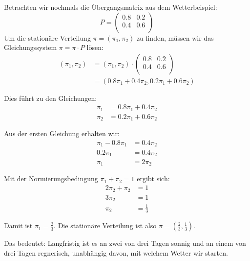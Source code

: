\begin{myexample}
    Betrachten wir nochmals die Übergangsmatrix aus dem Wetterbeispiel:
    \[
        P =
        \begin{pmatrix}
            0.8 & 0.2 \\
            0.4 & 0.6 \\
        \end{pmatrix}
    \]
    Um die stationäre Verteilung $\pi = (\pi_1, \pi_2)$ zu finden, müssen wir das Gleichungssystem $\pi = \pi \cdot P$ lösen:
    \[
        \begin{aligned}
            (\pi_1, \pi_2) & = (\pi_1, \pi_2) \cdot
            \begin{pmatrix}
                0.8 & 0.2 \\
                0.4 & 0.6 \\
            \end{pmatrix}                                            \\
                           & = (0.8\pi_1 + 0.4\pi_2, 0.2\pi_1 + 0.6\pi_2)
        \end{aligned}
    \]

    Dies führt zu den Gleichungen:
    \begin{align}
        \pi_1 & = 0.8\pi_1 + 0.4\pi_2 \\
        \pi_2 & = 0.2\pi_1 + 0.6\pi_2
    \end{align}

    Aus der ersten Gleichung erhalten wir:
    \begin{align}
        \pi_1 - 0.8\pi_1 & = 0.4\pi_2 \\
        0.2\pi_1         & = 0.4\pi_2 \\
        \pi_1            & = 2\pi_2
    \end{align}

    Mit der Normierungsbedingung $\pi_1 + \pi_2 = 1$ ergibt sich:
    \begin{align}
        2\pi_2 + \pi_2 & = 1           \\
        3\pi_2         & = 1           \\
        \pi_2          & = \frac{1}{3}
    \end{align}

    Damit ist $\pi_1 = \frac{2}{3}$. Die stationäre Verteilung ist also $\pi = (\frac{2}{3}, \frac{1}{3})$.

    Das bedeutet: Langfristig ist es an zwei von drei Tagen sonnig und an einem von drei Tagen regnerisch, unabhängig davon, mit welchem Wetter wir starten.
\end{myexample}

